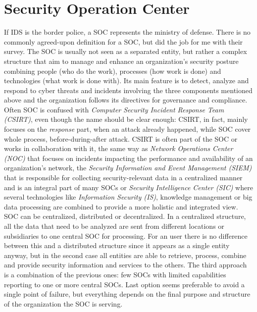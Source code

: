 \section{Security Operation Center}
If IDS is the border police, a SOC represents the ministry of defense. There is no commonly agreed-upon definition for a SOC, but \cite{Vielberth2020} did the job for me with their survey. The SOC is usually not seen as a separated entity, but rather a complex structure that aim to manage and enhance an organization's security posture combining people (who do the work), processes (how work is done) and technologies (what work is done with).
Its main feature is to detect, analyze and respond to cyber threats and incidents involving the three components mentioned above and the organization follows its directives for governance and compliance. Often SOC is confused with \textit{Computer Security Incident Response Team (CSIRT)}, even though the name should be clear enough: CSIRT, in fact, mainly focuses on the \textit{response} part, when an attack already happened, while SOC cover whole process, before-during-after attack. CSIRT is often part of the SOC or works in collaboration with it, the same way as \textit{Network Operations Center (NOC)} that focuses on incidents impacting the performance and availability of an organization’s network, the \textit{Security Information and Event Management (SIEM)} that is responsible for collecting security-relevant data in a centralized manner and is an integral part of many SOCs or \textit{Security Intelligence Center (SIC)} where several technologies like \textit{Information Security (IS)}, knowledge management or big data processing are combined to provide a more holistic and integrated view.\newline
SOC can be centralized, distributed or decentralized. In a centralized structure, all the data that need to be analyzed are sent from different locations or subsidiaries to one central SOC for processing. For an user there is no difference between this and a distributed structure since it appears as a single entity anyway, but in the second case all entities are able to retrieve, process, combine and provide security information and services to the others. The third approach is a combination of the previous ones: few SOCs with limited capabilities reporting to one or more central SOCs. Last option seems preferable to avoid a single point of failure, but everything depends on the final purpose and structure of the organization the SOC is serving.
